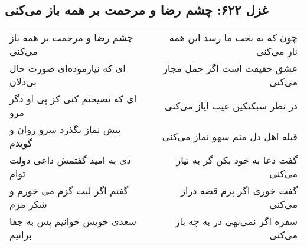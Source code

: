 \begin{center}
\section*{غزل ۶۲۲: چشم رضا و مرحمت بر همه باز می‌کنی}
\label{sec:622}
\begin{longtable}{l p{0.5cm} r}
چشم رضا و مرحمت بر همه باز می‌کنی
&&
چون که به بخت ما رسد این همه ناز می‌کنی
\\
ای که نیازموده‌ای صورت حال بی‌دلان
&&
عشق حقیقت است اگر حمل مجاز می‌کنی
\\
ای که نصیحتم کنی کز پی او دگر مرو
&&
در نظر سبکتکین عیب ایاز می‌کنی
\\
پیش نماز بگذرد سرو روان و گویدم
&&
قبله اهل دل منم سهو نماز می‌کنی
\\
دی به امید گفتمش داعی دولت توام
&&
گفت دعا به خود بکن گر به نیاز می‌کنی
\\
گفتم اگر لبت گزم می خورم و شکر مزم
&&
گفت خوری اگر پزم قصه دراز می‌کنی
\\
سعدی خویش خوانیم پس به جفا برانیم
&&
سفره اگر نمی‌نهی در به چه باز می‌کنی
\\
\end{longtable}
\end{center}
